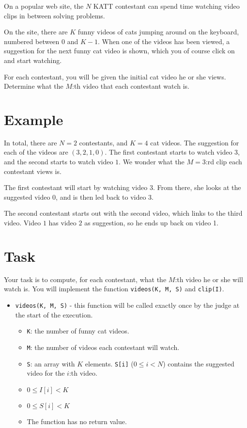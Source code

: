 \newcommand\version{v1}
On a popular web site, the $N$ KATT contestant can spend time watching video clips in between solving problems.

On the site, there are $K$ funny videos of cats jumping around on the keyboard, numbered between $0$ and $K - 1$.
When one of the videos has been viewed, a suggestion for the next funny cat video is shown, which you of course click on and start watching.

For each contestant, you will be given the initial cat video he or she views. Determine what the $M$:th video
that each contestant watch is.

\section*{Example}
In total, there are $N = 2$ contestants, and $K = 4$ cat videos.
The suggestion for each of the videos are $(3, 2, 1, 0)$. The first contestant starts to watch video $3$, and the second starts to watch video $1$.
We wonder what the $M = 3$:rd clip each contestant views is.

The first contestant will start by watching video 3. From there, she looks at the suggested video 0, and is then led back to video 3.

The second contestant starts out with the second video, which links to the third video. Video $1$ has video $2$ as suggestion, so he ends up back on video 1.

\section*{Task}
Your task is to compute, for each contestant, what the $M$:th video he or she will watch is.
You will implement the function \texttt{videos(K, M, S)} and \texttt{clip(I)}.

\begin{itemize}
  \item \texttt{videos(K, M, S)} - this function will be called exactly once by the judge at the start of the execution.
  \begin{itemize}
    \item \texttt{K}: the number of funny cat videos.
    \item \texttt{M}: the number of videos each contestant will watch.
    \item \texttt{S}: an array with $K$ elements. \texttt{S[i]} ($0 \le i < N$) contains the suggested video for the $i$:th video.
		\item $0 \le I[i] < K$
		\item $0 \le S[i] < K$
		\item The function has no return value.
  \end{itemize}
\end{itemize}

